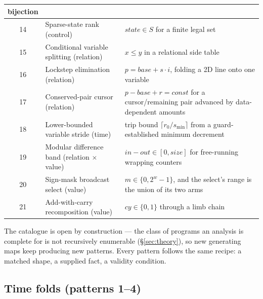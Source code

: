 \documentclass[11pt,a4paper]{article}
\begin{document}
\begin{center}
\begin{tabular}{clp{7.0cm}}
    bijection \\
\midrule
14 & Sparse-state rank (control) & $\mathit{state} \in S$ for a finite legal set \\
\midrule
15 & Conditional variable splitting (relation) & $x \le y$ in a relational side table \\
16 & Lockstep elimination (relation) & $p = \mathit{base} + s \cdot i$, folding a 2D
    line onto one variable \\
\midrule
17 & Conserved-pair cursor (relation) & $p - \mathit{base} + r = \mathit{const}$ for a
    cursor/remaining pair advanced by data-dependent amounts \\
18 & Lower-bounded variable stride (time) & trip bound $\lceil r_0 / s_{\min} \rceil$
    from a guard-established minimum decrement \\
19 & Modular difference band (relation $\times$ value) & $\mathit{in} - \mathit{out} \in
    [0, \mathit{size}]$ for free-running wrapping counters \\
20 & Sign-mask broadcast select (value) & $m \in \{0, 2^w{-}1\}$, and the select's range
    is the union of its two arms \\
21 & Add-with-carry recomposition (value) & $\mathit{cy} \in \{0,1\}$ through a limb
    chain \\
\bottomrule
\end{tabular}
\end{center}

The catalogue is open by construction --- the class of programs an analysis is complete
for is not recursively enumerable (\S\ref{sec:theory}), so new generating maps keep
producing new patterns. Every pattern follows the same recipe: a matched shape, a
supplied fact, a validity condition.

\subsection{Time folds (patterns 1--4)}
\end{document}
